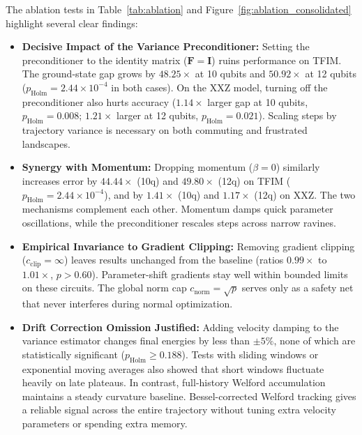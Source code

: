 \documentclass[11pt,a4paper]{article}
\begin{document}
The ablation tests in Table~\ref{tab:ablation} and Figure~\ref{fig:ablation_consolidated} highlight several clear findings:
\begin{itemize}
    \item \textbf{Decisive Impact of the Variance Preconditioner:} Setting the preconditioner to the identity matrix ($\mathbf{F}=\mathbf{I}$) ruins performance on TFIM. The ground-state gap grows by $48.25\times$ at 10 qubits and $50.92\times$ at 12 qubits ($p_{\text{Holm}} = 2.44 \times 10^{-4}$ in both cases). On the XXZ model, turning off the preconditioner also hurts accuracy ($1.14\times$ larger gap at 10 qubits, $p_{\text{Holm}} = 0.008$; $1.21\times$ larger at 12 qubits, $p_{\text{Holm}} = 0.021$). Scaling steps by trajectory variance is necessary on both commuting and frustrated landscapes.
    \item \textbf{Synergy with Momentum:} Dropping momentum ($\beta=0$) similarly increases error by $44.44\times$ (10q) and $49.80\times$ (12q) on TFIM ($p_{\text{Holm}} = 2.44 \times 10^{-4}$), and by $1.41\times$ (10q) and $1.17\times$ (12q) on XXZ. The two mechanisms complement each other. Momentum damps quick parameter oscillations, while the preconditioner rescales steps across narrow ravines.
    \item \textbf{Empirical Invariance to Gradient Clipping:} Removing gradient clipping ($c_{\text{clip}}=\infty$) leaves results unchanged from the baseline (ratios $0.99\times$ to $1.01\times$, $p > 0.60$). Parameter-shift gradients stay well within bounded limits on these circuits. The global norm cap $c_{\text{norm}} = \sqrt{p}$ serves only as a safety net that never interferes during normal optimization.
    \item \textbf{Drift Correction Omission Justified:} Adding velocity damping to the variance estimator changes final energies by less than $\pm 5\%$, none of which are statistically significant ($p_{\text{Holm}} \ge 0.188$). Tests with sliding windows or exponential moving averages also showed that short windows fluctuate heavily on late plateaus. In contrast, full-history Welford accumulation maintains a steady curvature baseline. Bessel-corrected Welford tracking gives a reliable signal across the entire trajectory without tuning extra velocity parameters or spending extra memory.
\end{itemize}
\end{document}
